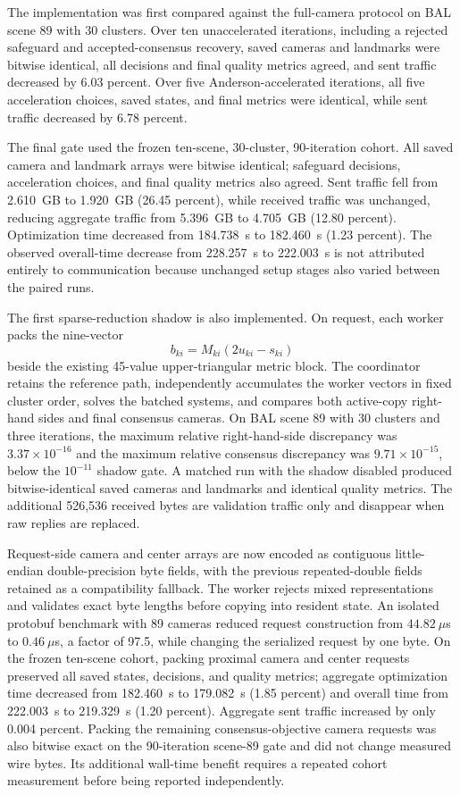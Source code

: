 The implementation was first compared against the full-camera protocol on BAL
scene 89 with 30 clusters.  Over ten unaccelerated iterations, including a
rejected safeguard and accepted-consensus recovery, saved cameras and landmarks
were bitwise identical, all decisions and final quality metrics agreed, and sent
traffic decreased by 6.03 percent.  Over five Anderson-accelerated iterations,
all five acceleration choices, saved states, and final metrics were identical,
while sent traffic decreased by 6.78 percent.

The final gate used the frozen ten-scene, 30-cluster, 90-iteration cohort.  All
saved camera and landmark arrays were bitwise identical; safeguard decisions,
acceleration choices, and final quality metrics also agreed.  Sent traffic fell
from 2.610~GB to 1.920~GB (26.45 percent), while received traffic was unchanged,
reducing aggregate traffic from 5.396~GB to 4.705~GB (12.80 percent).
Optimization time decreased from 184.738~s to 182.460~s (1.23 percent).  The
observed overall-time decrease from 228.257~s to 222.003~s is not attributed
entirely to communication because unchanged setup stages also varied between
the paired runs.

The first sparse-reduction shadow is also implemented.  On request, each worker
packs the nine-vector
\begin{equation}
  b_{ki}=M_{ki}(2u_{ki}-s_{ki})
\end{equation}
beside the existing 45-value upper-triangular metric block.  The coordinator
retains the reference path, independently accumulates the worker vectors in
fixed cluster order, solves the batched systems, and compares both active-copy
right-hand sides and final consensus cameras.  On BAL scene 89 with 30 clusters
and three iterations, the maximum relative right-hand-side discrepancy was
$3.37\times10^{-16}$ and the maximum relative consensus discrepancy was
$9.71\times10^{-15}$, below the $10^{-11}$ shadow gate.  A matched run with the
shadow disabled produced bitwise-identical saved cameras and landmarks and
identical quality metrics.  The additional 526,536 received bytes are
validation traffic only and disappear when raw replies are replaced.

Request-side camera and center arrays are now encoded as contiguous
little-endian double-precision byte fields, with the previous repeated-double
fields retained as a compatibility fallback.  The worker rejects mixed
representations and validates exact byte lengths before copying into resident
state.  An isolated protobuf benchmark with 89 cameras reduced request
construction from $44.82~\mu$s to $0.46~\mu$s, a factor of 97.5, while changing
the serialized request by one byte.  On the frozen ten-scene cohort, packing
proximal camera and center requests preserved all saved states, decisions, and
quality metrics; aggregate optimization time decreased from 182.460~s to
179.082~s (1.85 percent) and overall time from 222.003~s to 219.329~s
(1.20 percent).  Aggregate sent traffic increased by only 0.004 percent.
Packing the remaining consensus-objective camera requests was also bitwise
exact on the 90-iteration scene-89 gate and did not change measured wire bytes.
Its additional wall-time benefit requires a repeated cohort measurement before
being reported independently.

